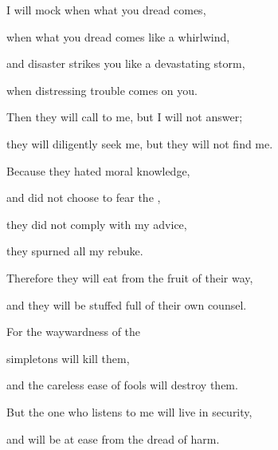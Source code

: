 {\par }{\Q I will mock
when
what you dread
comes,
\par }{\Q {}when what you dread
comes
like a whirlwind,
\par }{\Q and disaster
strikes
you like a devastating storm,
\par }{\Q when distressing
trouble
comes
on you.
\par }{\Q {}Then
they will call
to me, but I will not
answer;
\par }{\Q they will diligently
seek me, but they will not
find me.
\par }{\Q {}Because
they hated
moral
knowledge,
\par }{\Q and did not
choose
to fear
the {},
\par }{\Q {}they did not
comply
with my advice,
\par }{\Q they spurned
all
my rebuke.
\par }{\Q {}Therefore they
will eat
from the fruit
of their way,
\par }{\Q and they will be stuffed
full
of their own counsel.
\par }{\Q {}For
the waywardness
of the
\par }{\Q simpletons
will kill
them,
\par }{\Q and the careless
ease of fools
will destroy them.
\par }{\Q {}But
the one who listens
to me will live
in security,
\par }{\Q and will be at ease
from the dread
of harm.

}
